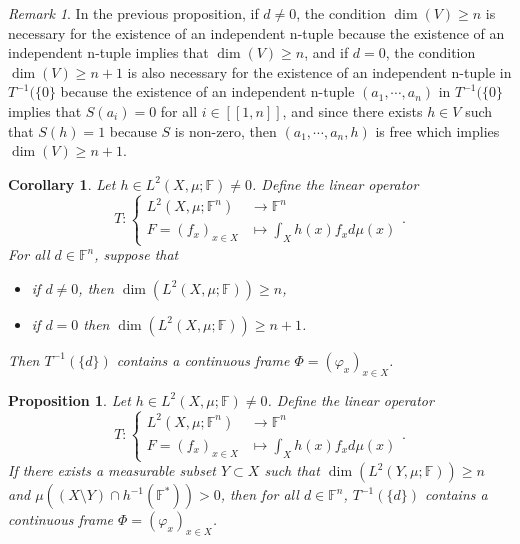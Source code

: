 \documentclass[a4paper,12pt]{article}
\theoremstyle{plain}
\newtheorem{proposition}{Proposition}[section]
\newtheorem{corollary}{Corollary}[section]
\theoremstyle{definition}
\theoremstyle{remark}
\newtheorem{remark}{Remark}[section]
\begin{document}
\begin{remark}
In the previous proposition, if $d \neq 0$, the condition $\dim(V) \geq n$ is necessary for the existence of an independent n-tuple because the existence of an independent n-tuple implies that $\dim(V) \geq n$, and if $d=0$, the condition $\dim(V) \geq n+1$ is also necessary for the existence of an independent n-tuple in $T^{-1}(\{0\}$ because the existence of an independent n-tuple $(a_1,\cdots,a_n)$ in $T^{-1}(\{0\}$ implies that $S(a_i) = 0$ for all $i \in [\![1,n]\!]$, and since there exists $h \in V$ such that $S(h)=1$ because $S$ is non-zero, then $(a_1,\cdots,a_n,h)$ is free which implies $\dim(V) \geq n+1$.
\end{remark}

\begin{corollary}
\label{CorT^(-1)(d)ContainsFrameEachCordTDependsSeparatelyOnOneVarCondDimL2X}
Let $h \in L^2(X,\mu;\mathbb{F}) \neq 0$. Define the linear operator 
\[ T : \begin{cases} L^2(X,\mu;\mathbb{F}^n) &\to \mathbb{F}^n \\ F = (f_x)_{x \in X} &\mapsto \int_X h(x)f_x d\mu(x) \end{cases}. \]
For all $d \in \mathbb{F}^n$, suppose that
\begin{itemize}
\item if $d \neq 0$, then $\dim(L^2(X,\mu;\mathbb{F})) \geq n$,
\item if $d = 0$ then $\dim(L^2(X,\mu;\mathbb{F})) \geq n+1$.
\end{itemize}
Then $T^{-1}(\{d\})$ contains a continuous frame $\Phi = (\varphi_x)_{x \in X}$.
\end{corollary}

\begin{proposition}
\label{PropT^(-1)(d)ContainsFrame}
Let $h \in L^2(X,\mu;\mathbb{F}) \neq 0$. Define the linear operator 
\[ T : \begin{cases} L^2(X,\mu;\mathbb{F}^n) &\to \mathbb{F}^n \\ F = (f_x)_{x \in X} &\mapsto \int_X h(x)f_x d\mu(x) \end{cases}. \]
If there exists a measurable subset $Y \subset X$ such that $\dim(L^2(Y,\mu;\mathbb{F})) \geq n$ and $\mu((X \setminus Y)\cap h^{-1}(\mathbb{F}^*)) >0$, then for all $d \in \mathbb{F}^n$, $T^{-1}(\{d\})$ contains a continuous frame $\Phi = (\varphi_x)_{x \in X}$.
\end{proposition}
\end{document}
